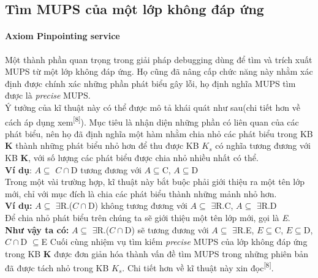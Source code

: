 \subsection{Tìm MUPS của một lớp không đáp ứng}
\paragraph{Axiom Pinpointing service} Một thành phần quan trọng trong giải pháp debugging dùng để tìm và trích xuất MUPS từ một lớp không đáp ứng. Họ cũng đã nâng cấp chức năng này nhằm xác định được chính xác những phần phát biểu gây lỗi, họ định nghĩa  
MUPS tìm được là \textit{precise} MUPS.
\\
Ý tưởng của kĩ thuật này có thể được mô tả khái quát như sau(chi tiết hơn về cách áp dụng xem\textsuperscript{[8]}). Mục tiêu là nhận diện những phần có liên quan của các phát biểu, nên họ đã định nghĩa một hàm nhằm chia nhỏ các phát biểu trong KB \textbf{K} thành những phát biểu nhỏ hơn để thu được KB $K_{s}$ có nghĩa tương đương với KB \textbf{K}, với số lượng các phát biểu được chia nhỏ nhiều nhất có thể.
\\\textbf{Ví dụ}:	 $A\subseteq$ $C\cap$D tương đương với $A\subseteq$C, $A\subseteq$D
\\
Trong một vài trường hợp, kĩ thuật này bắt buộc phải giới thiệu ra một tên lớp mới, chỉ với mục đích là chia các phát biểu thành những mảnh nhỏ hơn.
\\\textbf{Ví dụ:}	$A\subseteq$ $\exists$R.($C\cap$D) không tương đương với $A\subseteq$ $\exists$R.C, $A\subseteq$ $\exists$R.D
\\Để chia nhỏ phát biểu trên chúng ta sẽ giới thiệu một tên lớp mới, gọi là \textit{E}.
\\\textbf{Như vậy ta có:}
$A\subseteq$ $\exists$R.($C\cap$D) sẽ tương đương với $A\subseteq$ $\exists$R.E, $E\subseteq$C, $E\subseteq$D, $C\cap$D $\subseteq$E
Cuối cùng nhiệm vụ tìm kiếm \textit{precise} MUPS của lớp không đáp ứng trong KB \textbf{K} được đơn giản hóa thành vấn đề tìm MUPS trong những phiên bản đã được tách nhỏ trong KB $K_{s}$. Chi tiết hơn về kĩ thuật này xin đọc\textsuperscript{[8]}.
